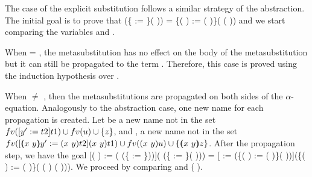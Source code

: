\begin{coqdoccode}
\end{coqdoccode}
The case of the explicit substitution follows a similar strategy of the abstraction. The initial goal is to prove that    (\{ := \}(   )) = \{(   ) := (   )\}(   (   )) and we start comparing the variables  and .
\begin{coqdoccode}
\end{coqdoccode}
When  = , the metasubstitution has no effect on the body of the metasubstitution but it can still be propagated to the term . Therefore, this case is proved using the induction hypothesis over . 
\begin{coqdoccode}
\end{coqdoccode}
When  \ensuremath{\not=} , then the metasubstitutions are propagated on both sides of the $\alpha$-equation. Analogously to the abstraction case, one new name for each propagation is created. Let  be a new name not in the set $fv(\esub{t1}{y'}{t2})\cup fv(u) \cup \{z\}$, and , a new name not in the set $fv(\esub{\swap{x}{y}{t1}}{\vswap{x}{y}{y'}}{\swap{x}{y}{t2}})\cup fv(\swap{x}{y}{u}) \cup \{\vswap{x}{y}{z}\}$. After the propagation step, we have the goal [(   ) := (   (\{ := \}))](   (\{ := \}(   ))) =
  [ := (\{(   ) := (   )\}(   ))](\{(   ) := (   )\}( (   )  (   ))). We proceed by comparing  and (   ).
